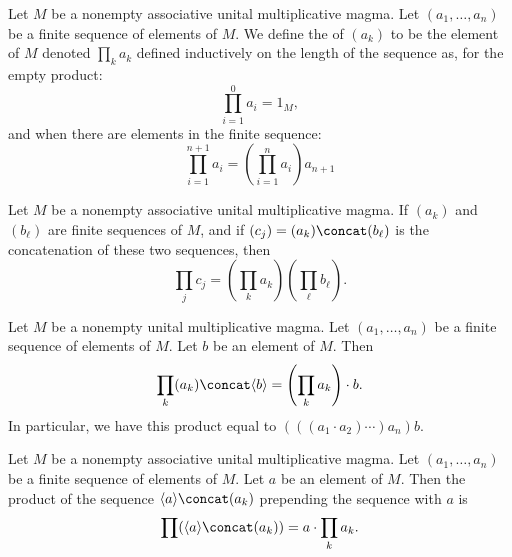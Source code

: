 \begin{definition}
Let $M$ be a nonempty associative unital multiplicative magma.
Let $(a_{1},\dots,a_{n})$ be a finite sequence of elements of $M$.
We define the  of $(a_{k})$ to be the element of $M$
denoted $\prod_{k}a_{k}$ defined inductively on the length of the
sequence as, for the empty product:
\begin{equation}
\prod^{0}_{i=1}a_{i}=1_{M},
\end{equation}
and when there are elements in the finite sequence:
\begin{equation}
\prod^{n+1}_{i=1}a_{i}=\left(\prod^{n}_{i=1}a_{i}\right)a_{n+1}
\end{equation}
\end{definition}

\begin{theorem}
Let $M$ be a nonempty associative unital multiplicative magma.
If $(a_{k})$ and $(b_{\ell})$ are finite sequences of $M$,
and if $(c_{j})=(a_{k})\concat(b_{\ell})$ is the concatenation of these
two sequences, then
\begin{equation}
\prod_{j}c_{j}=\left(\prod_{k}a_{k}\right)\left(\prod_{\ell}b_{\ell}\right).
\end{equation}
\end{theorem}

\begin{theorem}
Let $M$ be a nonempty unital multiplicative magma.
Let $(a_{1},\dots,a_{n})$ be a finite sequence of elements of $M$.
Let $b$ be an element of $M$. Then
\begin{equation*}
\prod_{k}(a_{k})\concat\langle
b\rangle=\left(\prod_{k}a_{k}\right)\cdot b.
\end{equation*}
In particular, we have this product equal to $(((a_{1}\cdot a_{2})\cdots)a_{n})b$.
\end{theorem}

\begin{theorem}
Let $M$ be a nonempty associative unital multiplicative magma.
Let $(a_{1},\dots,a_{n})$ be a finite sequence of elements of $M$.
Let $a$ be an element of $M$.
Then the product of the sequence $\langle a\rangle\concat(a_{k})$
prepending the sequence with $a$ is
\begin{equation*}
\prod(\langle a\rangle\concat(a_{k}))=a\cdot\prod_{k}a_{k}.
\end{equation*}
\end{theorem}


